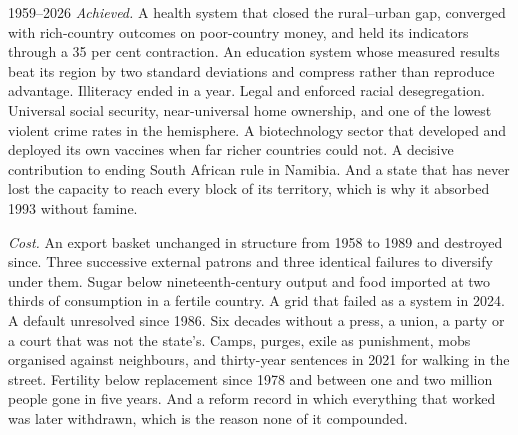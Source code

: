 \begin{ledger}{1959--2026}
\emph{Achieved.} A health system that closed the rural--urban gap, converged
with rich-country outcomes on poor-country money, and held its indicators
through a 35 per cent contraction. An education system whose measured results
beat its region by two standard deviations and compress rather than reproduce
advantage. Illiteracy ended in a year. Legal and enforced racial desegregation.
Universal social security, near-universal home ownership, and one of the lowest
violent crime rates in the hemisphere. A biotechnology sector that developed and
deployed its own vaccines when far richer countries could not. A decisive
contribution to ending South African rule in Namibia. And a state that has never
lost the capacity to reach every block of its territory, which is why it
absorbed 1993 without famine.

\emph{Cost.} An export basket unchanged in structure from 1958 to 1989 and
destroyed since. Three successive external patrons and three identical
failures to diversify under them. Sugar below nineteenth-century output and
food imported at two thirds of consumption in a fertile country. A grid that
failed as a system in 2024. A default unresolved since 1986. Six decades
without a press, a union, a party or a court that was not the state's. Camps,
purges, exile as punishment, mobs organised against neighbours, and
thirty-year sentences in 2021 for walking in the street. Fertility below
replacement since 1978 and between one and two million people gone in five
years. And a reform record in which everything that worked was later withdrawn,
which is the reason none of it compounded.
\end{ledger}
